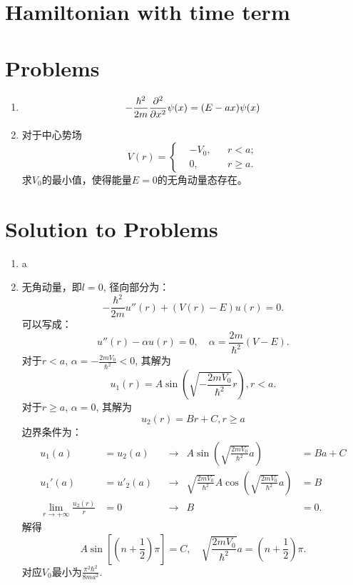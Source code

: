 \section{Hamiltonian with time term}
\newpage 
\section*{Problems}
\begin{enumerate}
    \item \begin{equation}
        -\frac{\hbar^2}{2m}\frac{\partial^2 }{\partial x^2}\psi(x)=(E-ax)\psi(x)
    \end{equation}
    \item 对于中心势场
    \begin{equation}
        V(r)=\left\lbrace
        \begin{aligned}
            &-V_0, && r<a;\\
            &0, && r\ge a.
        \end{aligned}\right.
    \end{equation}
    求$V_0$的最小值，使得能量$E=0$的无角动量态存在。
\end{enumerate}

\newpage
\section*{Solution to Problems}
\begin{enumerate}
    \item a
    \item 无角动量，即$l=0$, 径向部分为：
        \begin{equation}
                -\frac{\hbar^2}{2m}u''(r)+(V(r)-E)u(r)=0.
        \end{equation}
        可以写成：
        \begin{equation}
            u''(r)-\alpha u(r)=0,\quad \alpha = \frac{2m}{\hbar^2}(V-E).
        \end{equation}
        对于$r<a$, $\alpha=-\frac{2mV_0}{\hbar^2}<0$, 其解为 
        \begin{equation}
            u_1(r)=A\sin\left(\sqrt{-\frac{2mV_0}{\hbar^2}}r\right),r<a.
        \end{equation}
        对于$r\ge a$, $\alpha=0$, 其解为 
        \begin{equation}
            u_2(r)=Br+C, r\ge a
        \end{equation}
        边界条件为：
        \begin{align}
            u_1(a)&=u_2(a) &&\to &A\sin\left(\sqrt{\frac{2mV_0}{\hbar^2}}a\right)&=Ba+C\\
            u_1'(a)&=u'_2(a) &&\to &\sqrt{\frac{2mV_0}{\hbar^2}}A\cos\left(\sqrt{\frac{2mV_0}{\hbar^2}}a\right)&=B\\
            \lim_{r\to+\infty}\frac{u_2(r)}{r}&=0 &&\to &B&=0.
        \end{align}
        解得\begin{equation}
            A\sin[(n+\frac{1}{2})\pi]=C, \quad\sqrt{\frac{2mV_0}{\hbar^2}}a=(n+\frac{1}{2})\pi.
        \end{equation}
        对应$V_0$最小为$\frac{\pi^2\hbar^2}{8ma^2}$.
\end{enumerate}


